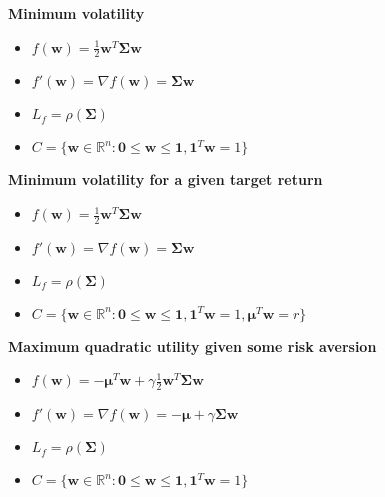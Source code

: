 \documentclass{beamer}
\begin{document}
\begin{frame}

\justifying
\textbf{Minimum volatility}
\begin{itemize}
	\item $f\left(\mathbf{w}\right) = \frac{1}{2}\mathbf{w}^{T}\mathbf{\Sigma}\mathbf{w}$
	\item $f'\left(\mathbf{w}\right) = \nabla f\left(\mathbf{w}\right) = \mathbf{\Sigma}\mathbf{w}$
	\item $L_{f} = \rho\left(\mathbf{\Sigma}\right)$
	\item $C = \{\mathbf{w} \in \mathbb{R}^{n} : \mathbf{0} \leq \mathbf{w} \leq \mathbf{1}, \mathbf{1}^{T}\mathbf{w} = 1\}$
\end{itemize}

\vspace{0.2cm}
\justifying
\textbf{Minimum volatility for a given target return}
\begin{itemize}
	\item $f\left(\mathbf{w}\right) = \frac{1}{2}\mathbf{w}^{T}\mathbf{\Sigma}\mathbf{w}$
	\item $f'\left(\mathbf{w}\right) = \nabla f\left(\mathbf{w}\right) = \mathbf{\Sigma}\mathbf{w}$
	\item $L_{f} = \rho\left(\mathbf{\Sigma}\right)$
	\item $C = \{\mathbf{w} \in \mathbb{R}^{n} : \mathbf{0} \leq \mathbf{w} \leq \mathbf{1}, \mathbf{1}^{T}\mathbf{w} = 1,\boldsymbol\mu^{T}\mathbf{w} = r\}$
\end{itemize}

\vspace{0.2cm}
\justifying
\textbf{Maximum quadratic utility given some risk aversion}
\begin{itemize}
	\item $f\left(\mathbf{w}\right) = -\boldsymbol\mu^{T}\mathbf{w} + \gamma\frac{1}{2}\mathbf{w}^{T}\mathbf{\Sigma}\mathbf{w}$
	\item $f'\left(\mathbf{w}\right) = \nabla f\left(\mathbf{w}\right) = -\boldsymbol\mu + \gamma\mathbf{\Sigma}\mathbf{w}$
	\item $L_{f} = \rho\left(\mathbf{\Sigma}\right)$
	\item $C = \{\mathbf{w} \in \mathbb{R}^{n} : \mathbf{0} \leq \mathbf{w} \leq \mathbf{1}, \mathbf{1}^{T}\mathbf{w} = 1\}$
\end{itemize}


\end{frame}
\end{document}
